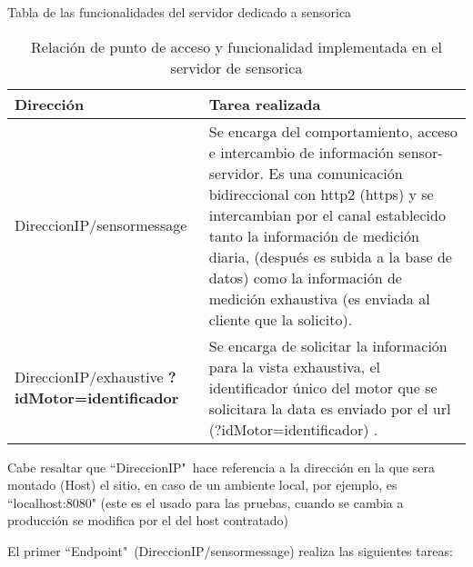     \begin{table}[ht]
        \begin{center}
            Tabla de las funcionalidades del servidor dedicado a sensorica   \\

            \vspace{0.3cm}
            \begin{tabular}{|p{5cm}|p{10cm}|}
                \hline
                Dirección       & Tarea realizada
                \\\hline\hline
                DireccionIP/sensormessage &
                Se encarga del comportamiento, acceso
                e intercambio de información sensor-servidor. Es una comunicación
                bidireccional con http2 (https) y se intercambian por el canal
                establecido tanto la información de medición diaria, (después es
                subida a la base de datos) como la
                información de medición exhaustiva (es enviada al cliente que
                la solicito).

                \\\hline
                DireccionIP/exhaustive \textbf{?idMotor=identificador}   &
                Se encarga de solicitar la información para la vista exhaustiva,
                el identificador único del motor que se solicitara la data
                es enviado por el url (?idMotor=identificador) .
                \\\hline
            \end{tabular}

            \vspace{0.3cm}
            Cabe resaltar que ``DireccionIP"\ hace referencia a la dirección en la
            que sera montado (Host) el sitio, en caso de un ambiente local, por
            ejemplo, es ``localhost:8080" (este es el usado para las pruebas,
            cuando se cambia a producción se modifica por el del host contratado)
        \end{center}
        \caption[Funciones Servidor Sensorica]{ Relación de punto de acceso y
        funcionalidad implementada en el servidor de sensorica}
        \label{tab:ServerSensorica}
    \end{table}


    El primer ``Endpoint"\ (DireccionIP/sensormessage) realiza las siguientes tareas:

